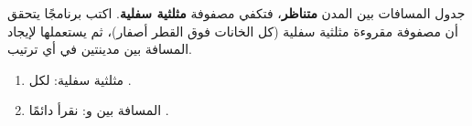 \begin{statement}
جدول المسافات بين المدن \textbf{متناظر}، فتكفي مصفوفة \textbf{مثلثية سفلية}. اكتب برنامجًا يتحقق أن مصفوفة مقروءة مثلثية سفلية (كل الخانات فوق القطر أصفار)، ثم يستعملها لإيجاد المسافة بين مدينتين في أي ترتيب.
\end{statement}
\begin{stepsbox}\begin{enumerate}
\item مثلثية سفلية:  لكل .
\item المسافة بين  و: نقرأ دائمًا .
\end{enumerate}\end{stepsbox}

